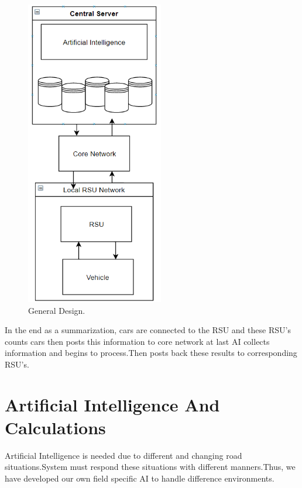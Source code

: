 \documentclass[conference]{IEEEtran}
\begin{document}
 \begin{figure}[h!]
     \centering
     \includegraphics[width=6cm]{arc.PNG}
     
     \caption{General Design.}
     \label{fig:my_label}
     
 \end{figure} 
In the end as a summarization, cars are connected to the RSU and these RSU's counts cars then posts this information to core network at last AI collects information and begins to process.Then posts back these results to corresponding RSU's. 

\section{Artificial Intelligence And Calculations}
Artificial Intelligence is needed due to different and changing road situations.System must respond these situations with different manners.Thus, we have developed our own field specific AI to handle difference environments.
\\
\end{document}
